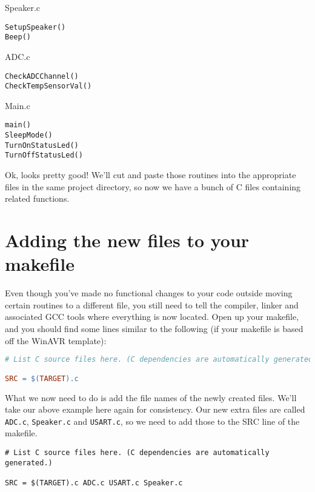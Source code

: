 \documentclass[a4paper,oneside,notitlepage]{article}
\begin{document}
Speaker.c
\begin{center}
\begin{lstlisting}
SetupSpeaker()
Beep()
\end{lstlisting}
\end{center}

ADC.c
\begin{center}
\begin{lstlisting}
CheckADCChannel()
CheckTempSensorVal()
\end{lstlisting}
\end{center}

Main.c
\begin{center}
\begin{lstlisting}
main()
SleepMode()
TurnOnStatusLed()
TurnOffStatusLed()
\end{lstlisting}
\end{center}

Ok, looks pretty good! We'll cut and paste those routines into the appropriate files in the same project directory, so now we have a bunch of C files containing related functions.

\section{Adding the new files to your makefile}

Even though you've made no functional changes to your code outside moving certain routines to a different file, you still need to tell the compiler, linker and associated GCC tools where everything is now located. Open up your makefile, and you should find some lines similar to the following (if your makefile is based off the WinAVR template):

\begin{center}
\begin{lstlisting}[language=make]
# List C source files here. (C dependencies are automatically generated.)

SRC = $(TARGET).c
\end{lstlisting}
\end{center}

What we now need to do is add the file names of the newly created files. We'll take our above example here again for consistency. Our new extra files are called \texttt{ADC.c}, \texttt{Speaker.c} and \texttt{USART.c}, so we need to add those to the SRC line of the makefile.

\begin{center}
\begin{lstlisting}
# List C source files here. (C dependencies are automatically generated.)

SRC = $(TARGET).c ADC.c USART.c Speaker.c
\end{lstlisting}
\end{center}
\end{document}
